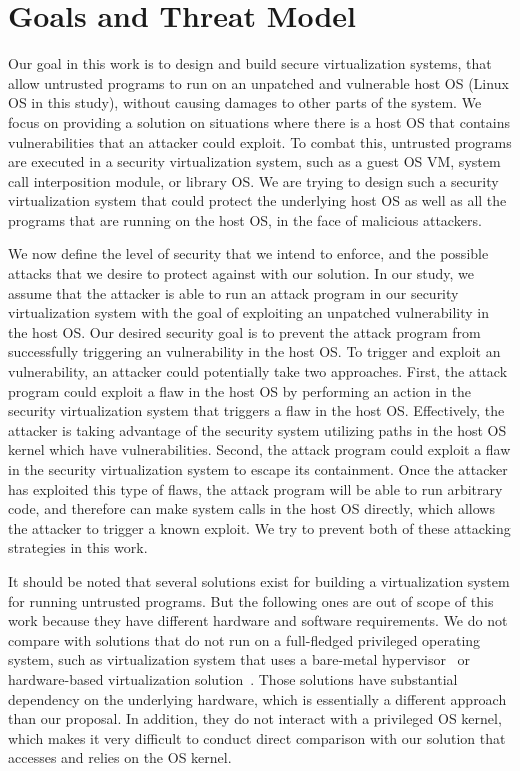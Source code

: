 \section{Goals and Threat Model}
\label{sec.motivation-and-background}

Our goal in this work is to design and build secure virtualization systems, that allow untrusted programs to run 
on an unpatched and vulnerable host OS (Linux OS in this study), without causing damages to other parts of the system. 
We focus on providing a solution on situations where there is a host OS that contains vulnerabilities
that an attacker could exploit. To combat this, untrusted programs are executed in a security virtualization system, 
such as a guest OS VM, system call interposition module, or library OS. We are trying to design such a security virtualization system 
that could protect the underlying host OS as well as all the programs that are running on the host OS, in the face of malicious attackers. 

We now define the level of security that we intend to enforce, and the possible attacks that we desire to protect against with our solution. 
In our study, we assume that the attacker is able to run an attack program in our security virtualization system with the goal of 
exploiting an unpatched vulnerability in the host OS. Our desired security goal is to prevent the attack program from successfully 
triggering an vulnerability in the host OS. 
To trigger and exploit an vulnerability, an attacker could potentially take two approaches. 
First, the attack program could exploit a flaw in the host OS by 
performing an action in the security virtualization system that triggers a flaw in
the host OS. Effectively, the attacker is taking advantage of the security 
system utilizing paths in the host OS kernel which have vulnerabilities.
Second, the attack program could exploit a flaw in the security virtualization system to 
escape its containment. Once the attacker has exploited this type of flaws, the
attack program will be able to run arbitrary code, and therefore 
can make system calls in the host OS directly, which allows
the attacker to trigger a known exploit. We try to prevent both of these attacking 
strategies in this work. 

It should be noted that several solutions exist for building a virtualization system for running untrusted programs. 
But the following ones are out of scope of this work because they have different hardware and software requirements.  
We do not compare with solutions that do not run on a full-fledged 
privileged operating system, such as virtualization system that uses a 
bare-metal hypervisor~\cite{Xen-03} or hardware-based virtualization 
solution~\cite{IntelVT}. Those solutions have substantial dependency on the underlying hardware, which is essentially 
a different approach than our proposal. In addition, they do not interact with a privileged OS kernel, which makes it very difficult 
to conduct direct comparison with our solution that accesses and relies on the OS kernel. 

